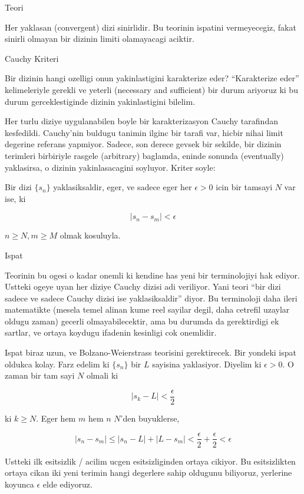 \documentclass[12pt,fleqn]{article}\usepackage{../common}
\begin{document}
Teori 

Her yaklasan (convergent) dizi sinirlidir. Bu teorinin ispatini
vermeyecegiz, fakat sinirli olmayan bir dizinin limiti olamayacagi
aciktir. 

Cauchy Kriteri 

Bir dizinin hangi ozelligi onun yakinlastigini karakterize eder?
``Karakterize eder'' kelimeleriyle gerekli ve yeterli (necessary and
sufficient) bir durum ariyoruz ki bu durum gerceklestiginde dizinin
yakinlastigini bilelim. 

Her turlu diziye uygulanabilen boyle bir karakterizasyon Cauchy tarafindan
kesfedildi. Cauchy'nin buldugu tanimin ilginc bir tarafi var, hicbir nihai
limit degerine referans yapmiyor. Sadece, son derece gevsek bir sekilde,
bir dizinin terimleri birbiriyle rasgele (arbitrary) baglamda, eninde
sonunda (eventually) yaklasirsa, o dizinin yakinlasacagini soyluyor. Kriter
soyle:

Bir dizi $\{s_n\}$ yaklasiksaldir, eger, ve sadece eger her $\epsilon > 0$
icin bir tamsayi $N$ var ise, ki 

\[ |s_n - s_m| < \epsilon \]

$n \ge N, m \ge M$ olmak kosuluyla. 

Ispat

Teorinin bu ogesi o kadar onemli ki kendine has yeni bir terminolojiyi hak
ediyor. Ustteki ogeye uyan her diziye Cauchy dizisi adi veriliyor. Yani
teori ``bir dizi sadece ve sadece Cauchy dizisi ise yaklasiksaldir''
diyor. Bu terminoloji daha ileri matematikte (mesela temel alinan kume reel
sayilar degil, daha cetrefil uzaylar oldugu zaman) gecerli
olmayabilecektir, ama bu durumda da gerektirdigi ek sartlar, ve ortaya
koydugu ifadenin kesinligi cok onemlidir.

Ispat biraz uzun, ve Bolzano-Weierstrass teorisini gerektirecek. Bir
yondeki ispat oldukca kolay. Farz edelim ki $\{s_n\}$ bir $L$ sayisina
yaklasiyor. Diyelim ki $\epsilon > 0$. O zaman bir tam sayi $N$ olmali ki 

\[ |s_k - L| < \frac{\epsilon}{2} \]

ki $k \ge N$. Eger hem $m$ hem $n$ $N$'den buyuklerse, 

\[ |s_n - s_m| \le |s_n - L| + |L - s_m| < 
\frac{\epsilon}{2} + \frac{\epsilon}{2} <
\epsilon
\]

Ustteki ilk esitsizlik / acilim ucgen esitsizliginden ortaya cikiyor. Bu
esitsizlikten ortaya cikan iki yeni terimin hangi degerlere sahip oldugunu
biliyoruz, yerlerine koyunca $\epsilon$ elde ediyoruz. 
\end{document}
